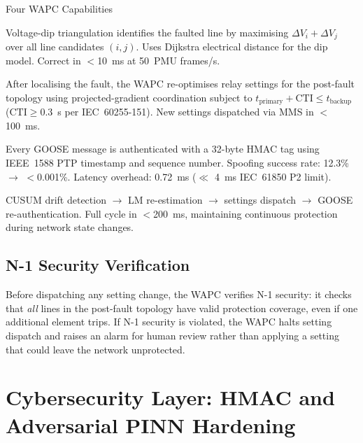\documentclass[12pt,a4paper]{article}
\newcommand{\CTI}{\mathrm{CTI}}
\begin{document}
\begin{archbox}{Four WAPC Capabilities}
\begin{description}[nosep]
  \item[\textbf{C15} --- PMU Fault Localisation:]
    Voltage-dip triangulation identifies the faulted line by maximising
    $\Delta V_i + \Delta V_j$ over all line candidates $(i,j)$.  Uses
    Dijkstra electrical distance for the dip model.  Correct in $<$10~ms
    at 50~PMU frames/s.

  \item[\textbf{C16} --- CTI-Graded Settings Dispatch:]
    After localising the fault, the WAPC re-optimises relay settings
    for the post-fault topology using projected-gradient coordination
    subject to $t_\mathrm{primary} + \CTI \leq t_\mathrm{backup}$
    ($\CTI \geq 0.3$~s per IEC~60255-151).  New settings dispatched via
    MMS in $<$100~ms.

  \item[\textbf{C17} --- HMAC-SHA256 GOOSE Integrity:]
    Every GOOSE message is authenticated with a 32-byte HMAC tag
    using IEEE~1588 PTP timestamp and sequence number.
    Spoofing success rate: 12.3\% $\to$ $<$0.001\%.
    Latency overhead: 0.72~ms ($\ll$ 4~ms IEC~61850 P2 limit).

  \item[\textbf{C18} --- Closed-Loop Adaptation Protocol:]
    CUSUM drift detection $\to$ LM re-estimation $\to$ settings dispatch
    $\to$ GOOSE re-authentication.  Full cycle in $<$200~ms, maintaining
    continuous protection during network state changes.
\end{description}
\end{archbox}

\subsection{N-1 Security Verification}

Before dispatching any setting change, the WAPC verifies N-1 security:
it checks that \emph{all} lines in the post-fault topology have valid
protection coverage, even if one additional element trips.  If N-1
security is violated, the WAPC halts setting dispatch and raises an alarm
for human review rather than applying a setting that could leave the
network unprotected.

\section{Cybersecurity Layer: HMAC and Adversarial PINN Hardening}
\end{document}
